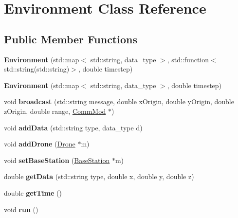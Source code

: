 \hypertarget{class_environment}{}\section{Environment Class Reference}
\label{class_environment}
\subsection*{Public Member Functions}
\begin{DoxyCompactItemize}
\item 
{\bfseries Environment} (std\+::map$<$ std\+::string, data\+\_\+type $>$, std\+::function$<$ std\+::string(std\+::string)$>$, double timestep)\hypertarget{class_environment_aaddf445dbf4217a68a373e183a2bfb0c}{}\label{class_environment_aaddf445dbf4217a68a373e183a2bfb0c}

\item 
{\bfseries Environment} (std\+::map$<$ std\+::string, data\+\_\+type $>$, double timestep)\hypertarget{class_environment_a098fcd6da9a033833095ec76f60aab0d}{}\label{class_environment_a098fcd6da9a033833095ec76f60aab0d}

\item 
void {\bfseries broadcast} (std\+::string message, double x\+Origin, double y\+Origin, double z\+Origin, double range, \hyperlink{class_comm_mod}{Comm\+Mod} $\ast$)\hypertarget{class_environment_a8d5bb36197739b8fb8532755210865c4}{}\label{class_environment_a8d5bb36197739b8fb8532755210865c4}

\item 
void {\bfseries add\+Data} (std\+::string type, data\+\_\+type d)\hypertarget{class_environment_abadae98bdccb015d49c6f94c97a8bf82}{}\label{class_environment_abadae98bdccb015d49c6f94c97a8bf82}

\item 
void {\bfseries add\+Drone} (\hyperlink{class_drone}{Drone} $\ast$m)\hypertarget{class_environment_a95654e6bc17cbd781453fdb256fa979b}{}\label{class_environment_a95654e6bc17cbd781453fdb256fa979b}

\item 
void {\bfseries set\+Base\+Station} (\hyperlink{class_base_station}{Base\+Station} $\ast$m)\hypertarget{class_environment_aa06fdaa6619d957c10d858c176f3f307}{}\label{class_environment_aa06fdaa6619d957c10d858c176f3f307}

\item 
double {\bfseries get\+Data} (std\+::string type, double x, double y, double z)\hypertarget{class_environment_a0a2b32ecbd52779d17b3d9a483aa6d24}{}\label{class_environment_a0a2b32ecbd52779d17b3d9a483aa6d24}

\item 
double {\bfseries get\+Time} ()\hypertarget{class_environment_a03d9d2db949b5491e60e922d9a33769b}{}\label{class_environment_a03d9d2db949b5491e60e922d9a33769b}

\item 
void {\bfseries run} ()\hypertarget{class_environment_a41a43b88702fff5df95e98d10e49f541}{}\label{class_environment_a41a43b88702fff5df95e98d10e49f541}

\end{DoxyCompactItemize}
